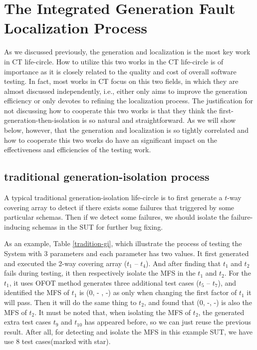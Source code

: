 \documentclass{sig-alternate}
\begin{document}
\section{The Integrated Generation Fault Localization Process}
As we discussed previously, the generation and localization is the most key work in CT life-circle. How to utilize this two works in the CT life-circle is of importance as it is closely related to the quality and cost of overall software testing. In fact, most works in CT focus on this two fields, in which they are almost discussed independently, i.e., either only aims to improve the generation efficiency or only devotes to refining the localization process. The justification for not discussing how to cooperate this two works is that they think the first-generation-then-isolation is so natural and straightforward. As we will show below, however, that the generation and localization is so tightly correlated and how to cooperate this two works do have an significant impact on the effectiveness and efficiencies of the testing work.


\subsection{traditional generation-isolation process}
A typical traditional generation-isolation life-circle is to first generate a $t$-way covering array to detect if there exists some failures that triggered by some particular schemas. Then if we detect some failures, we should isolate the failure-inducing schemas in the SUT for further bug fixing.

As an example, Table \ref{tradition-gi}, which illustrate the process of testing the System with 3 parameters and each parameter has two values. It first generated and executed the 2-way covering array ($t_{1}$ -- $t_{4}$). And after finding that $t_{1}$ and $t_{2}$ fails during testing, it then respectively isolate the MFS in the $t_{1}$ and $t_{2}$. For the $t_{1}$, it uses OFOT method generates three additional test cases ($t_{5}$ -- $t_{7}$), and identified the MFS of $t_{1}$ is (0, - , -) as only when changing the first factor of $t_{1}$ it will pass. Then it will do the same thing to $t_{2}$, and found that (0, -, -) is also the MFS of $t_{2}$. It must be noted that, when isolating the MFS of $t_{2}$, the generated extra test cases $t_{9}$ and $t_{10}$ has appeared before, so we can just reuse the previous result. After all, for detecting and isolate the MFS in this example SUT, we have use 8 test cases(marked with star).
\end{document}
